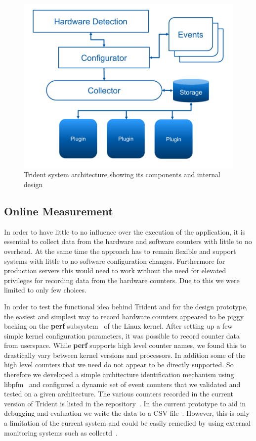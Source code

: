 \documentclass{webofc}
\begin{document}
\begin{figure}
  \centering
	\captionsetup{justification=centering}
  \includegraphics[width=0.5\linewidth]{Design.pdf}
	\setlength{\belowcaptionskip}{-10pt}
\caption{Trident system architecture showing its components and internal design}
\label{fig:design}
\end{figure}

\subsection{Online Measurement}

In order to have little to no influence over the execution of the application, it is essential to collect data from the hardware and software counters with little to no overhead. At the same time the approach has to remain flexible and support systems with little to no software configuration changes. Furthermore for production servers this would need to work without the need for elevated privileges for recording data from the hardware counters. Due to this we were limited to only few choices. 

In order to test the functional idea behind Trident and for the design prototype, the easiest and simplest way to record hardware counters appeared to be piggy backing on the \textbf{perf} subsystem~\cite{perfwiki} of the Linux kernel. After setting up a few simple kernel configuration parameters, it was possible to record counter data from userspace. While \textbf{perf} supports high level counter names, we found this to drastically vary between kernel versions and processors. In addition some of the high level counters that we need do not appear to be directly supported. So therefore we developed a simple architecture identification mechanism using libpfm~\cite{eranian2008perfmon2} and configured a dynamic set of event counters that we validated and tested on a given architecture. The various counters recorded in the current version of Trident is listed in the repository~\cite{tridentrepo}. In the current prototype to aid in debugging and evaluation we write the data to a CSV file~\cite{shafranovich2005common}. However, this is only a limitation of the current system and could be easily remedied by using external monitoring systems such as collectd~\cite{forster2012collectd}.
\end{document}
